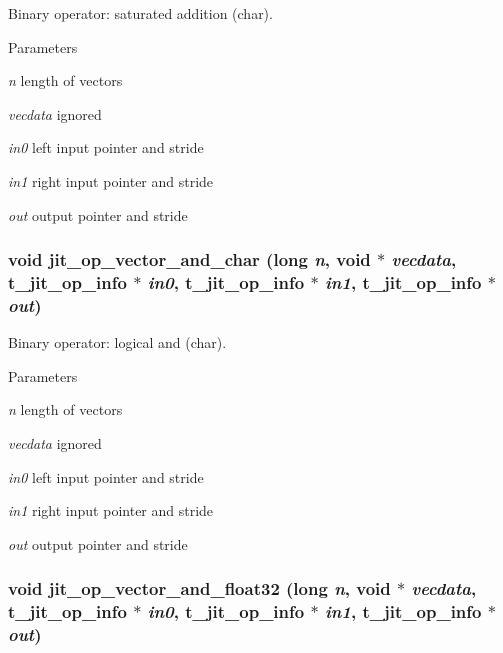 Binary operator: saturated addition (char). 
\begin{DoxyParams}{Parameters}
\item[{\em n}]length of vectors \item[{\em vecdata}]ignored \item[{\em in0}]left input pointer and stride \item[{\em in1}]right input pointer and stride \item[{\em out}]output pointer and stride \end{DoxyParams}
\hypertarget{group__opvecmod_ga3357a8134a44c8229dcfbbc94950bd5f}{
\subsubsection[{jit\_\-op\_\-vector\_\-and\_\-char}]{\setlength{\rightskip}{0pt plus 5cm}void jit\_\-op\_\-vector\_\-and\_\-char (long {\em n}, \/  void $\ast$ {\em vecdata}, \/  {\bf t\_\-jit\_\-op\_\-info} $\ast$ {\em in0}, \/  {\bf t\_\-jit\_\-op\_\-info} $\ast$ {\em in1}, \/  {\bf t\_\-jit\_\-op\_\-info} $\ast$ {\em out})}}
\label{group__opvecmod_ga3357a8134a44c8229dcfbbc94950bd5f}


Binary operator: logical and (char). 
\begin{DoxyParams}{Parameters}
\item[{\em n}]length of vectors \item[{\em vecdata}]ignored \item[{\em in0}]left input pointer and stride \item[{\em in1}]right input pointer and stride \item[{\em out}]output pointer and stride \end{DoxyParams}
\hypertarget{group__opvecmod_ga22fa0793f8dfa1cc5165c160defea3db}{
\subsubsection[{jit\_\-op\_\-vector\_\-and\_\-float32}]{\setlength{\rightskip}{0pt plus 5cm}void jit\_\-op\_\-vector\_\-and\_\-float32 (long {\em n}, \/  void $\ast$ {\em vecdata}, \/  {\bf t\_\-jit\_\-op\_\-info} $\ast$ {\em in0}, \/  {\bf t\_\-jit\_\-op\_\-info} $\ast$ {\em in1}, \/  {\bf t\_\-jit\_\-op\_\-info} $\ast$ {\em out})}}
\label{group__opvecmod_ga22fa0793f8dfa1cc5165c160defea3db}


